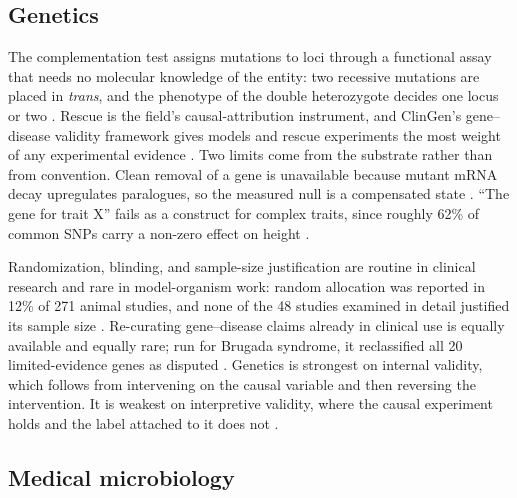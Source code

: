 \documentclass{article}
\begin{document}
\subsection{Genetics}

The complementation test assigns mutations to loci through a functional assay that needs no molecular knowledge of the entity: two recessive mutations are placed in \emph{trans}, and the phenotype of the double heterozygote decides one locus or two \citep{yook2005complementation}. Rescue is the field's causal-attribution instrument, and ClinGen's gene--disease validity framework gives models and rescue experiments the most weight of any experimental evidence \citep{strande2017evaluating}. Two limits come from the substrate rather than from convention. Clean removal of a gene is unavailable because mutant mRNA decay upregulates paralogues, so the measured null is a compensated state \citep{elbrolosy2019genetic}. ``The gene for trait X'' fails as a construct for complex traits, since roughly 62\% of common SNPs carry a non-zero effect on height \citep{boyle2017expanded}.

Randomization, blinding, and sample-size justification are routine in clinical research and rare in model-organism work: random allocation was reported in 12\% of 271 animal studies, and none of the 48 studies examined in detail justified its sample size \citep{kilkenny2009survey}. Re-curating gene--disease claims already in clinical use is equally available and equally rare; run for Brugada syndrome, it reclassified all 20 limited-evidence genes as disputed \citep{hosseini2018reappraisal}. Genetics is strongest on internal validity, which follows from intervening on the causal variable and then reversing the intervention. It is weakest on interpretive validity, where the causal experiment holds and the label attached to it does not \citep{hosseini2018reappraisal, border2019no, schnoes2009annotation}.

\subsection{Medical microbiology}
\end{document}
